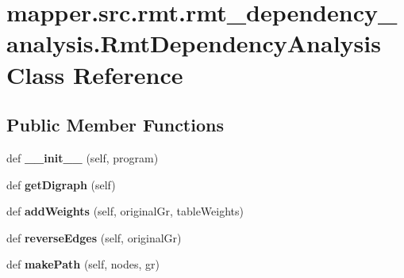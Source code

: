 \hypertarget{classmapper_1_1src_1_1rmt_1_1rmt__dependency__analysis_1_1_rmt_dependency_analysis}{}\section{mapper.\+src.\+rmt.\+rmt\+\_\+dependency\+\_\+analysis.\+Rmt\+Dependency\+Analysis Class Reference}
\label{classmapper_1_1src_1_1rmt_1_1rmt__dependency__analysis_1_1_rmt_dependency_analysis}
\subsection*{Public Member Functions}
\begin{DoxyCompactItemize}
\item 
\hypertarget{classmapper_1_1src_1_1rmt_1_1rmt__dependency__analysis_1_1_rmt_dependency_analysis_ab43ea3be4b4c695cb787a3732c31a7b1}{}def {\bfseries \+\_\+\+\_\+init\+\_\+\+\_\+} (self, program)\label{classmapper_1_1src_1_1rmt_1_1rmt__dependency__analysis_1_1_rmt_dependency_analysis_ab43ea3be4b4c695cb787a3732c31a7b1}

\item 
\hypertarget{classmapper_1_1src_1_1rmt_1_1rmt__dependency__analysis_1_1_rmt_dependency_analysis_a5bae8dbec45dba2918caf43e61c0bd64}{}def {\bfseries get\+Digraph} (self)\label{classmapper_1_1src_1_1rmt_1_1rmt__dependency__analysis_1_1_rmt_dependency_analysis_a5bae8dbec45dba2918caf43e61c0bd64}

\item 
\hypertarget{classmapper_1_1src_1_1rmt_1_1rmt__dependency__analysis_1_1_rmt_dependency_analysis_a10ff32390763529a860360065d7b44a1}{}def {\bfseries add\+Weights} (self, original\+Gr, table\+Weights)\label{classmapper_1_1src_1_1rmt_1_1rmt__dependency__analysis_1_1_rmt_dependency_analysis_a10ff32390763529a860360065d7b44a1}

\item 
\hypertarget{classmapper_1_1src_1_1rmt_1_1rmt__dependency__analysis_1_1_rmt_dependency_analysis_a14e25182eb92ce5b9a6302190ec03965}{}def {\bfseries reverse\+Edges} (self, original\+Gr)\label{classmapper_1_1src_1_1rmt_1_1rmt__dependency__analysis_1_1_rmt_dependency_analysis_a14e25182eb92ce5b9a6302190ec03965}

\item 
\hypertarget{classmapper_1_1src_1_1rmt_1_1rmt__dependency__analysis_1_1_rmt_dependency_analysis_aeae46b81fb21e7262da8ea06e85ff83e}{}def {\bfseries make\+Path} (self, nodes, gr)\label{classmapper_1_1src_1_1rmt_1_1rmt__dependency__analysis_1_1_rmt_dependency_analysis_aeae46b81fb21e7262da8ea06e85ff83e}


\end{DoxyCompactItemize}
